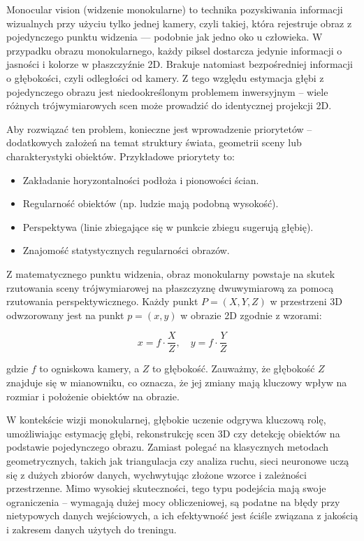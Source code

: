 \documentclass[magisterska]{pracadypl}
\begin{document}
Monocular vision (widzenie monokularne) to technika pozyskiwania informacji wizualnych przy użyciu tylko jednej kamery, czyli takiej, która rejestruje obraz z pojedynczego punktu widzenia — podobnie jak jedno oko u człowieka.
W przypadku obrazu monokularnego, każdy piksel dostarcza jedynie informacji o jasności i kolorze w płaszczyźnie 2D. Brakuje natomiast bezpośredniej informacji o głębokości, czyli odległości od kamery. Z tego względu estymacja głębi z pojedynczego obrazu jest niedookreślonym problemem inwersyjnym – wiele różnych trójwymiarowych scen może prowadzić do identycznej projekcji 2D.

Aby rozwiązać ten problem, konieczne jest wprowadzenie priorytetów – dodatkowych założeń na temat struktury świata, geometrii sceny lub charakterystyki obiektów. Przykładowe priorytety to:

\begin{itemize}
  \item Zakładanie horyzontalności podłoża i pionowości ścian.

  \item Regularność obiektów (np. ludzie mają podobną wysokość).

  \item Perspektywa (linie zbiegające się w punkcie zbiegu sugerują głębię).

  \item Znajomość statystycznych regularności obrazów.
\end{itemize}

Z matematycznego punktu widzenia, obraz monokularny powstaje na skutek rzutowania sceny trójwymiarowej na płaszczyznę dwuwymiarową za pomocą rzutowania perspektywicznego. Każdy punkt $P = (X,Y,Z)$ w przestrzeni 3D odwzorowany jest na punkt $p = (x,y)$ w obrazie 2D zgodnie z wzorami:

\[
x = f \cdot \frac{X}{Z}, \quad
y = f \cdot \frac{Y}{Z}
\]

gdzie $f$ to ogniskowa kamery, a $Z$ to głębokość. Zauważmy, że głębokość $Z$ znajduje się w mianowniku, co oznacza, że jej zmiany mają kluczowy wpływ na rozmiar i położenie obiektów na obrazie.

W kontekście wizji monokularnej, głębokie uczenie odgrywa kluczową rolę, umożliwiając estymację głębi, rekonstrukcję scen 3D czy detekcję obiektów na podstawie pojedynczego obrazu. Zamiast polegać na klasycznych metodach geometrycznych, takich jak triangulacja czy analiza ruchu, sieci neuronowe uczą się z dużych zbiorów danych, wychwytując złożone wzorce i zależności przestrzenne. Mimo wysokiej skuteczności, tego typu podejścia mają swoje ograniczenia – wymagają dużej mocy obliczeniowej, są podatne na błędy przy nietypowych danych wejściowych, a ich efektywność jest ściśle związana z jakością i zakresem danych użytych do treningu.
\end{document}
